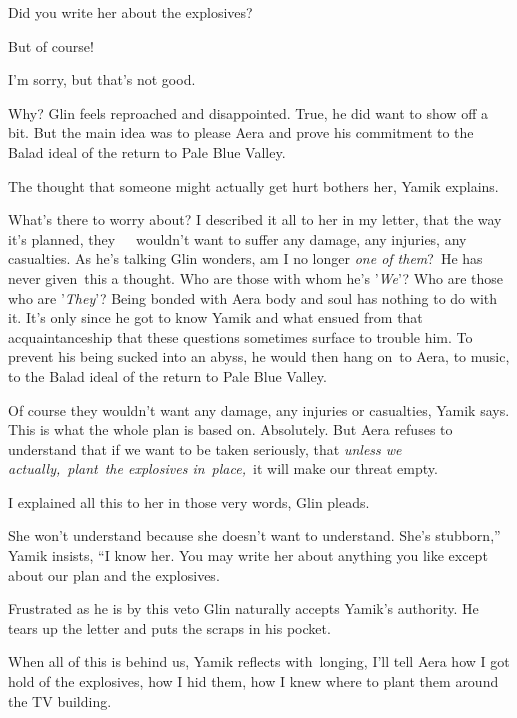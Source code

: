 \documentclass[twoside,11pt]{book}
\begin{document}
{\textquotedbl}Did you write her about the explosives?{\textquotedbl} 

{\textquotedbl}But of course!{\textquotedbl}~ 

{\textquotedbl}I'm sorry, but that's not good.{\textquotedbl} 

{\textquotedbl}Why?{\textquotedbl} Glin feels reproached and disappointed. True, he did want to show off a bit. But the
main idea was to please Aera and prove his commitment to the Balad ideal of the return to Pale Blue Valley. 

{\textquotedbl}The thought that someone might actually get hurt bothers her,{\textquotedbl} Yamik explains.

{\textquotedbl}What's there to worry about? I described it all to her in my letter, that the way it's planned,
they\ \ \ wouldn't want to suffer any damage, any injuries, any casualties.{\textquotedbl} As he's talking Glin
wonders, am I no longer \textit{one of them}?{\ }He has never given~this a
thought. Who are those with whom he's '\textit{We}{}'? Who are those who are '\textit{They}{}'? Being bonded with Aera
body and soul has nothing to do with it. It's only since he got to know Yamik and what ensued from that
acquaintanceship that these questions sometimes surface to trouble him. To prevent his being sucked into an abyss, he
would then hang on\ to Aera, to music, to the Balad ideal of the return to Pale Blue Valley. 

{\textquotedbl}Of course they wouldn't want any damage, any injuries or casualties,{\textquotedbl} Yamik says.
{\textquotedbl}This is what the whole plan is based on. Absolutely. But Aera refuses to understand that if we want to
be taken seriously, that \textit{unless we actually,}\ \textit{plant}\ \textit{the explosives in}\ \textit{place,\ }it
will make our threat empty.{\textquotedbl} \ 

{\textquotedbl}I explained all this to her in those very words,{\textquotedbl} Glin pleads. 

{\textquotedbl}She won't understand because she doesn't want to understand. She's stubborn,'' Yamik insists, ``I know
her. You may write her about anything you like except about our plan and the explosives.{\textquotedbl} 

Frustrated as he is by this veto Glin naturally accepts Yamik's authority. He tears up the letter and puts the scraps in
his pocket. 

When all of this is behind us, Yamik reflects with~longing, I'll tell Aera how I got hold of the explosives, how I hid
them, how I knew where to plant them around the TV building.
\end{document}
